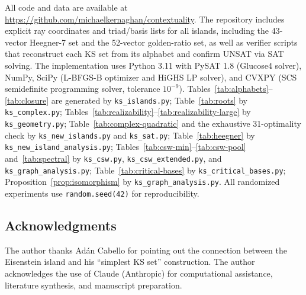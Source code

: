 \documentclass[12pt,a4paper]{article}
\begin{document}
All code and data are available at \url{https://github.com/michaelkernaghan/contextuality}. The repository includes explicit ray coordinates and triad/basis lists for all islands, including the 43-vector Heegner-7 set and the 52-vector golden-ratio set, as well as verifier scripts that reconstruct each KS set from its alphabet and confirm UNSAT via SAT solving. The implementation uses Python 3.11 with PySAT 1.8 (Glucose4 solver), NumPy, SciPy (L-BFGS-B optimizer and HiGHS LP solver), and CVXPY (SCS semidefinite programming solver, tolerance $10^{-9}$). Tables~\ref{tab:alphabets}--\ref{tab:closure} are generated by \texttt{ks\_islands.py}; Table~\ref{tab:roots} by \texttt{ks\_complex.py}; Tables~\ref{tab:realizability}--\ref{tab:realizability-large} by \texttt{ks\_geometry.py}; Table~\ref{tab:complex-quadratic} and the exhaustive 31-optimality check by \texttt{ks\_new\_islands.py} and \texttt{ks\_sat.py}; Table~\ref{tab:heegner} by \texttt{ks\_new\_island\_analysis.py}; Tables~\ref{tab:csw-min}--\ref{tab:csw-pool} and~\ref{tab:spectral} by \texttt{ks\_csw.py}, \texttt{ks\_csw\_extended.py}, and \texttt{ks\_graph\_analysis.py}; Table~\ref{tab:critical-bases} by \texttt{ks\_critical\_bases.py}; Proposition~\ref{prop:isomorphism} by \texttt{ks\_graph\_analysis.py}. All randomized experiments use \texttt{random.seed(42)} for reproducibility.

\subsection*{Acknowledgments}

The author thanks Ad\'an Cabello for pointing out the connection between the Eisenstein island and his ``simplest KS set'' construction. The author acknowledges the use of Claude (Anthropic) for computational assistance, literature synthesis, and manuscript preparation.
\end{document}
